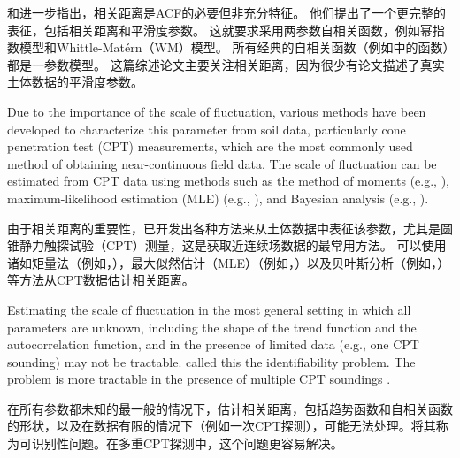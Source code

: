 \begin{ParaColumn}
    \switchcolumn

    \citet{Ching2018}和\citet{Ching201981}进一步指出，相关距离是ACF的必要但非充分特征。 他们提出了一个更完整的表征，包括相关距离和平滑度参数。 这就要求采用两参数自相关函数，例如幂指数模型和Whittle-Matérn（WM）模型。 所有经典的自相关函数（例如中的函数）都是一参数模型。 这篇综述论文主要关注相关距离，因为很少有论文描述了真实土体数据的平滑度参数。

    \CrossColumnText{
        
    }

    \switchcolumn*

    Due to the importance of the scale of fluctuation, various methods have been developed to characterize this parameter from soil data, particularly cone penetration test (CPT) measurements, which are the most commonly used method of obtaining near-continuous field data. The scale of fluctuation can be estimated from CPT data using methods such as the method of moments (e.g., \citet{Tang19791173,Lacasse199649,Uzielli20053,Zhang20101475}), maximum-likelihood estimation (MLE) (e.g., \cite{DeGroot1993147,Fenton1999470,Hicks2005123,Jaksa2005109,Lloret-Cabot2014129}), and Bayesian analysis (e.g., \citet{Wang2010354,Cao2012267,Tian2016197}).

    \switchcolumn

    由于相关距离的重要性，已开发出各种方法来从土体数据中表征该参数，尤其是圆锥静力触探试验（CPT）测量，这是获取近连续场数据的最常用方法。 可以使用诸如矩量法（例如，\citet{Tang19791173,Lacasse199649,Uzielli20053,Zhang20101475}），最大似然估计（MLE）（例如，\cite{DeGroot1993147,Fenton1999470,Hicks2005123,Jaksa2005109,Lloret-Cabot2014129}）以及贝叶斯分析（例如，\citet{Wang2010354,Cao2012267,Tian2016197}）等方法从CPT数据估计相关距离。

    \switchcolumn*

    Estimating the scale of fluctuation in the most general setting in which all parameters are unknown, including the shape of the trend function and the autocorrelation function, and in the presence of limited data (e.g., one CPT sounding) may not be tractable. \citet{Ching2017a} called this the identifiability problem. The problem is more tractable in the presence of multiple CPT soundings \citep{Ching2016d,Ching2016e,Ching2017,Xiao2019}.

    \switchcolumn

    在所有参数都未知的最一般的情况下，估计相关距离，包括趋势函数和自相关函数的形状，以及在数据有限的情况下（例如一次CPT探测），可能无法处理。\citet{Ching2017a}将其称为可识别性问题。在多重CPT探测中，这个问题更容易解决\citep{Ching2016d,Ching2016e,Ching2017,Xiao2019}。


\end{ParaColumn}
